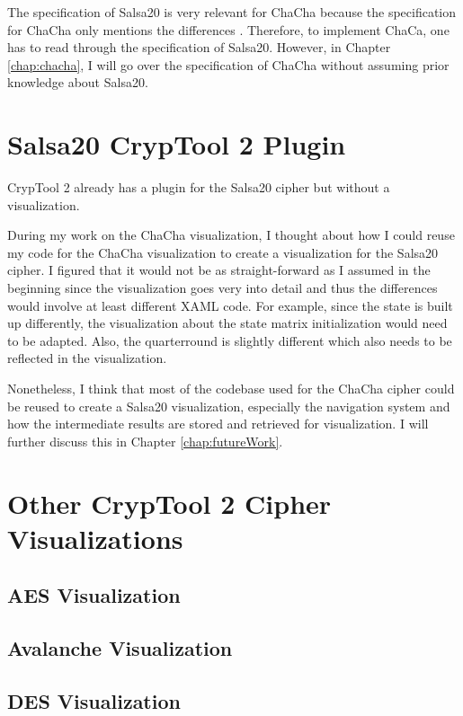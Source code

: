 The specification of Salsa20 is very relevant for ChaCha because the specification for ChaCha only mentions the differences \cite{chachaspec}. Therefore, to implement ChaCa, one has to read through the specification of Salsa20.  However, in Chapter \ref{chap:chacha}, I will go over the specification of ChaCha without assuming prior knowledge about Salsa20.


\section{Salsa20 CrypTool 2 Plugin}
\label{sec:salsaCT2Plugin}

CrypTool 2 already has a plugin for the Salsa20 cipher but without a visualization.

During my work on the ChaCha visualization, I thought about how I could reuse my code for the ChaCha visualization to create a visualization for the Salsa20 cipher. I figured that it would not be as straight-forward as I assumed in the beginning since the visualization goes very into detail and thus the differences would involve at least different XAML code. For example, since the state is built up differently, the visualization about the state matrix initialization would need to be adapted. Also, the quarterround is slightly different which also needs to be reflected in the visualization. 

Nonetheless, I think that most of the codebase used for the ChaCha cipher could be reused to create a Salsa20 visualization, especially the navigation system and how the intermediate results are stored and retrieved for visualization. I will further discuss this in Chapter \ref{chap:futureWork}.


\section{Other CrypTool 2 Cipher Visualizations}
\label{sec:otherCT2CipherVisualizations}

\subsection{AES Visualization}
\label{sec:aesVisualization}

\blindtext[2]

\blindtext[2]

\subsection{Avalanche Visualization}
\label{sec:avalancheVisualization}

\blindtext[2]

\subsection{DES Visualization}
\label{sec:desVisualization}

\blindtext[2]
